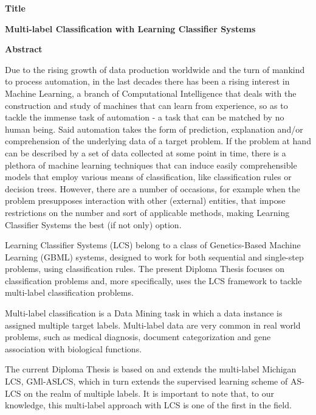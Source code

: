 {\selectfont 

\begin{center}
\centering
\textbf{\Large{Title}}
\vspace{0.5cm}

\textbf{\large{Multi-label Classification with Learning Classifier Systems}}

\vspace{1cm}

\centering
\textbf{Abstract}
\end{center}



Due to the rising growth of data production worldwide and the turn of mankind to process automation, in the last decades there has been a rising interest in Machine Learning, a branch of Computational Intelligence that deals with the construction and study of machines that can learn from experience, so as to tackle the immense task of automation - a task that can be matched by no human being. Said automation takes the form of prediction, explanation and/or comprehension of the underlying data of a target problem. If the problem at hand can be described by a set of data collected at some point in time, there is a plethora of machine learning techniques that can induce easily comprehensible  models that employ various means of classification, like classification rules or decision trees. However, there are a number of occasions, for example when the problem presupposes interaction with other (external) entities, that impose restrictions on the number and sort of applicable methods, making Learning Classifier Systems the best (if not only) option.

Learning Classifier Systems (LCS) belong to a class of Genetics-Based Machine Learning (GBML) systems, designed to work for both sequential and single-step problems, using classification rules. The present Diploma Thesis focuses on classification problems and, more specifically,  uses the LCS framework to tackle multi-label classification problems.

Multi-label classification is a Data Mining task in which a data instance is assigned multiple target labels. Multi-label data are very common in real world problems, such as medical diagnosis, document categorization and gene association with biological functions.

The current Diploma Thesis is based on and extends the multi-label Michigan LCS, GMl-ASLCS, which in turn extends the supervised learning scheme of AS-LCS on the realm of multiple labels. It is important to note that, to our knowledge, this multi-label approach with LCS is one of the first in the field.

}
